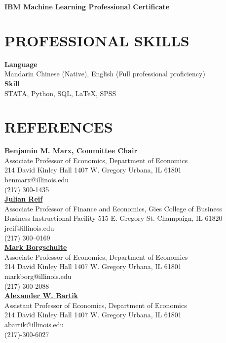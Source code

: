 \documentclass[a4paper,9pt]{extarticle}
\begin{document}
\noindent
\textbf{IBM Machine Learning Professional Certificate} \\

\section*{PROFESSIONAL SKILLS}

\noindent
\newline
\textbf{Language} \\
Mandarin Chinese (Native), English (Full professional proficiency) \\

\noindent
\textbf{Skill} \\
STATA, Python, SQL, \LaTeX, SPSS \\


\section*{REFERENCES}

\noindent
\newline
\textbf{\href{https://sites.google.com/site/benjaminmmarx/}{Benjamin M. Marx}, Committee Chair} \\
Associate Professor of Economics, Department of Economics \\
214 David Kinley Hall
1407 W. Gregory
Urbana, IL  61801\\
benmarx@illinois.edu \\
(217) 300-1435 \\

\noindent
\textbf{\href{https://julianreif.com}{Julian Reif}} \\
Associate Professor of Finance and Economics, Gies College of Business \\
Business Instructional Facility 515 E. Gregory St.
Champaign, IL 61820\\
jreif@illinois.edu \\
(217) 300–0169 \\

\noindent
\textbf{\href{https://sites.google.com/site/markborgschulte/home}{Mark Borgschulte}} \\
Associate Professor of Economics, Department of Economics \\
214 David Kinley Hall
1407 W. Gregory
Urbana, IL  61801\\
markborg@illinois.edu \\
(217) 300-2088 \\
 
\noindent
\textbf{\href{https://www.alexbartik.com}{Alexander W. Bartik}} \\
Assistant Professor of Economics, Department of Economics \\
214 David Kinley Hall
1407 W. Gregory
Urbana, IL  61801\\
abartik@illinois.edu \\
(217)-300-6027 \\
\end{document}
